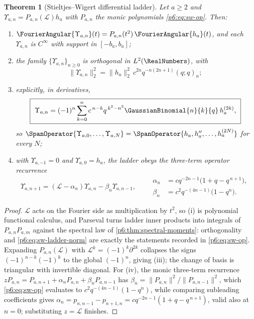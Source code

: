 \documentclass[11pt,oneside]{article}
\numberwithin{equation}{section}
\newtheorem{theorem}{Theorem}[section]
\theoremstyle{definition}
\theoremstyle{remark}
\begin{document}
\begin{theorem}[Stieltjes--Wigert differential ladder]\label{p6:thm:sw-ladder}
Let $a\ge2$ and $\Upsilon_{a,n}=P_{a,n}(\mathcal L)h_a$ with $P_{a,n}$ the
monic polynomials \eqref{p6:eq:sw-op}.  Then:
\begin{enumerate}
\item $\FourierAngular{\Upsilon_{a,n}}(t)=P_{a,n}(t^2)\,\FourierAngular{h_a}(t)$, and each
$\Upsilon_{a,n}$ is $C^\infty$ with support in $[-b_a,b_a]$;
\item the family $\{\Upsilon_{a,n}\}_{n\ge0}$ is orthogonal in $L^2(\RealNumbers)$,
with
\begin{equation}\label{p6:eq:sw-ladder-norm}
 \|\Upsilon_{a,n}\|_2^2
 =\|h_a\|_2^2\,c^{2n}q^{-n(2n+1)}(q;q)_n;
\end{equation}
\item explicitly, in derivatives,
\begin{equation}\label{p6:eq:sw-ladder-expansion}
 \boxed{\ \Upsilon_{a,n}
 =(-1)^n\sum_{k=0}^{n}c^{\,n-k}q^{\,k^2-n^2}\GaussianBinomial{n}{k}{q}\,h_a^{(2k)},\ }
\end{equation}
so $\SpanOperator\{\Upsilon_{a,0},\ldots,\Upsilon_{a,N}\}
=\SpanOperator\{h_a,h_a'',\ldots,h_a^{(2N)}\}$ for every $N$;
\item with $\Upsilon_{a,-1}=0$ and $\Upsilon_{a,0}=h_a$, the ladder obeys
the three-term operator recurrence
\begin{equation}\label{p6:eq:sw-ladder-recurrence}
 \Upsilon_{a,n+1}
 =(\mathcal L-\alpha_n)\Upsilon_{a,n}-\beta_n\Upsilon_{a,n-1},
 \qquad
 \begin{aligned}
 \alpha_n&=cq^{-2n-1}\bigl(1+q-q^{\,n+1}\bigr),\\
 \beta_n&=c^2q^{-(4n-1)}\bigl(1-q^n\bigr).
 \end{aligned}
\end{equation}
\end{enumerate}
\end{theorem}

\begin{proof}
$\mathcal L$ acts on the Fourier side as multiplication by $t^2$, so (i) is
polynomial functional calculus, and Parseval turns ladder inner products
into integrals of $P_{a,n}P_{a,m}$ against the spectral law of
\cref{p6:thm:spectral-moments}: orthogonality and
\eqref{p6:eq:sw-ladder-norm} are exactly the statements recorded in
\eqref{p6:eq:sw-op}.  Expanding $P_{a,n}(\mathcal L)$ with
$\mathcal L^k=(-1)^k\partial^{2k}$ collapses the signs
$(-1)^{n-k}(-1)^k$ to the global $(-1)^n$, giving (iii); the change of basis
is triangular with invertible diagonal.  For (iv), the monic three-term
recurrence $zP_{a,n}=P_{a,n+1}+\alpha_nP_{a,n}+\beta_nP_{a,n-1}$ has
$\beta_n=\|P_{a,n}\|^2/\|P_{a,n-1}\|^2$, which \eqref{p6:eq:sw-op}
evaluates to $c^2q^{-(4n-1)}(1-q^n)$, while comparing subleading
coefficients gives
$\alpha_n=p_{n,n-1}-p_{n+1,n}=cq^{-2n-1}(1+q-q^{\,n+1})$, valid also at
$n=0$; substituting $z=\mathcal L$ finishes.
\end{proof}
\end{document}
